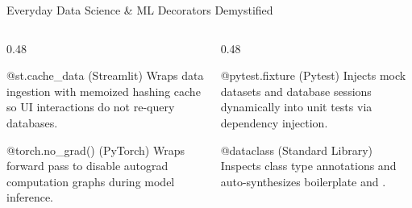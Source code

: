 \begin{frame}{Everyday Data Science \& ML Decorators Demystified}
  \begin{columns}[T,onlytextwidth]
    \begin{column}{0.48\textwidth}
      \begin{ConceptBox}{@st.cache\_data (Streamlit)}
        \scriptsize Wraps data ingestion with memoized hashing cache so UI interactions do not re-query databases.
      \end{ConceptBox}
      \vspace{0.05cm}
      \begin{ConceptBox}{@torch.no\_grad() (PyTorch)}
        \scriptsize Wraps forward pass to disable autograd computation graphs during model inference.
      \end{ConceptBox}
    \end{column}
    \begin{column}{0.48\textwidth}
      \begin{ConceptBox}{@pytest.fixture (Pytest)}
        \scriptsize Injects mock datasets and database sessions dynamically into unit tests via dependency injection.
      \end{ConceptBox}
      \vspace{0.05cm}
      \begin{ConceptBox}{@dataclass (Standard Library)}
        \scriptsize Inspects class type annotations and auto-synthesizes boilerplate  and .
      \end{ConceptBox}
    \end{column}
  \end{columns}
  \vspace{0.06cm}
\end{frame}

